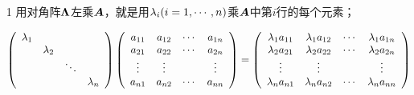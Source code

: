 \begin{frame}
\begin{zhu*}
  \begin{itemize}
  \item[1] 用对角阵$\boldsymbol{\Lambda}$左乘$\boldsymbol{A}$，就是用$\lambda_i(i=1,\cdots,n)$乘$\boldsymbol{A}$中第$i$行的每个元素；
    \begin{footnotesize}
    $$
    \left(
      \begin{array}{cccc}
        \lambda_1 & & &\\
                  & \lambda_2 & & \\
                  & & \ddots & \\
                  & & & \lambda_n
      \end{array}
    \right)
    \left(
      \begin{array}{cccc}
        a_{11} & a_{12} & \cdots & a_{1n}\\
        a_{21} & a_{22} & \cdots & a_{2n}\\
        \vdots & \vdots &  & \vdots\\
        a_{n1} & a_{n2} & \cdots & a_{nn}
      \end{array}
    \right) = 
    \left(
      \begin{array}{cccc}
        \lambda_1 a_{11} & \lambda_1a_{12} & \cdots & \lambda_1a_{1n}\\
        \lambda_2a_{21} & \lambda_2a_{22} & \cdots & \lambda_2a_{2n}\\
        \vdots & \vdots &  & \vdots\\
        \lambda_na_{n1} & \lambda_na_{n2} & \cdots & \lambda_na_{nn}
      \end{array}
    \right)
    $$
  \end{footnotesize} \vspace{.1in}
  

\end{itemize}
\end{zhu*}
\end{frame}
